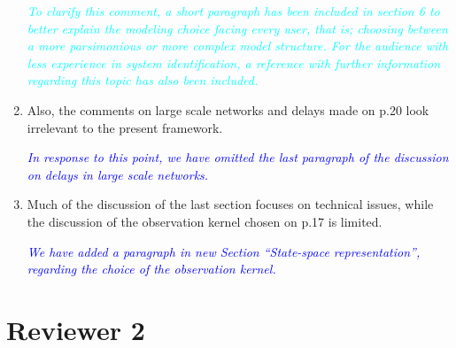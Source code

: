 \documentclass{article}
\newcommand{\parham}[1]{\textcolor{blue}{#1}}
\newcommand{\ken}[1]{\textcolor{cyan}{#1}}
\begin{document}
\begin{enumerate}
				\emph{\ken{To clarify this comment, a short paragraph has been included in section 6 to better explain the modeling choice facing every user, that is; choosing between a more parsimonious or more complex model structure.  For the audience with less experience in system identification, a reference with further information regarding this topic has also been included.}}
				
				\item Also, the comments on large scale networks and delays made on p.20 look irrelevant to the present framework.
				
				\emph{\parham{In response to this point, we have omitted the last paragraph of the discussion on delays in large scale networks.}}
				
				\item Much of the discussion of the last section focuses on technical issues, while the discussion of the observation kernel chosen on p.17 is limited.
				
				\emph{\parham{We have added a paragraph in new Section ``State-space representation'', regarding the choice of the observation kernel.}}

    \end{enumerate}
    
    \section{Reviewer 2}
    
\end{document}
